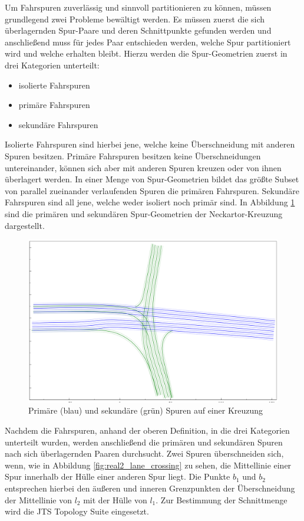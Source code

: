 Um Fahrspuren zuverlässig und sinnvoll partitionieren zu können, müssen grundlegend zwei Probleme bewältigt
werden. Es müssen zuerst die sich überlagernden Spur-Paare und deren Schnittpunkte gefunden werden und
anschließend muss für jedes Paar entschieden werden, welche Spur partitioniert wird und welche erhalten bleibt.
Hierzu werden die Spur-Geometrien zuerst in drei Kategorien unterteilt:

\begin{itemize}
    \item isolierte Fahrspuren
    \item primäre Fahrspuren
    \item sekundäre Fahrspuren
\end{itemize}

Isolierte Fahrspuren sind hierbei jene, welche keine Überschneidung mit anderen Spuren besitzen. Primäre
Fahrspuren besitzen keine Überschneidungen untereinander, können sich aber mit anderen Spuren kreuzen oder
von ihnen überlagert werden. In einer Menge von Spur-Geometrien bildet das größte Subset von parallel
zueinander verlaufenden Spuren die primären Fahrspuren. Sekundäre Fahrspuren sind all jene, welche
weder isoliert noch primär sind. In Abbildung \ref{fig:real2_prim_and_sec_lanes} sind die primären und
sekundären Spur-Geometrien der Neckartor-Kreuzung dargestellt.

\begin{figure}[H]
    \centering
    \includegraphics[width=0.4\linewidth]{resources/img/umsetzung/U2/prims_and_secs}
    \caption[Primäre und Sekundäre Spur-Geometrien einer Kreuzung]{Primäre (blau) und sekundäre (grün) Spuren auf einer Kreuzung}
    \label{fig:real2_prim_and_sec_lanes}
\end{figure}

Nachdem die Fahrspuren, anhand der oberen Definition, in die drei Kategorien unterteilt wurden, werden
anschließend die primären und sekundären Spuren nach sich überlagernden Paaren durchsucht.
Zwei Spuren überschneiden sich, wenn, wie in
Abbildung \ref{fig:real2_lane_crossing} zu sehen, die Mittellinie einer Spur innerhalb der Hülle einer
anderen Spur liegt. Die Punkte $b_1$ und $b_2$ entsprechen hierbei den äußeren und inneren Grenzpunkten
der Überschneidung der Mittellinie von $l_2$ mit der Hülle von $l_1$. Zur Bestimmung der Schnittmenge
wird die JTS Topology Suite eingesetzt.

